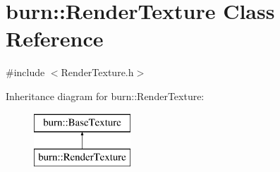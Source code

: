 \hypertarget{classburn_1_1_render_texture}{\section{burn\-:\-:Render\-Texture Class Reference}
\label{classburn_1_1_render_texture}
}


{\ttfamily \#include $<$Render\-Texture.\-h$>$}

Inheritance diagram for burn\-:\-:Render\-Texture\-:\begin{figure}[H]
\begin{center}
\leavevmode
\includegraphics[height=2.000000cm]{classburn_1_1_render_texture}
\end{center}
\end{figure}

